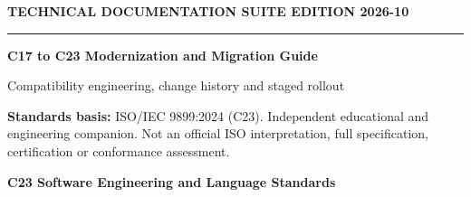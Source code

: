 \documentclass[10pt,letterpaper,oneside]{report}
\begin{document}
\hypersetup{pageanchor=false}%
\begin{titlepage}
\color{ink}\vspace*{1.2in}
{\sffamily\small\color{accent}\bfseries TECHNICAL DOCUMENTATION SUITE \hfill EDITION 2026-10}\par
\vspace{.3in}\rule{\linewidth}{1.5pt}\par\vspace{.22in}
{\Huge\bfseries C17 to C23 Modernization and Migration Guide}\par\vspace{.22in}
{\Large\color{grayblue}Compatibility engineering, change history and staged rollout}\par\vspace{.4in}
\begin{keybox}\textbf{Standards basis:} ISO/IEC 9899:2024 (C23). Independent educational and engineering companion. Not an official ISO interpretation, full specification, certification or conformance assessment.\end{keybox}
\vfill{\large\bfseries C23 Software Engineering and Language Standards}\par{}\par
\end{titlepage}\hypersetup{pageanchor=true}
\tableofcontents\clearpage{}
\end{document}
